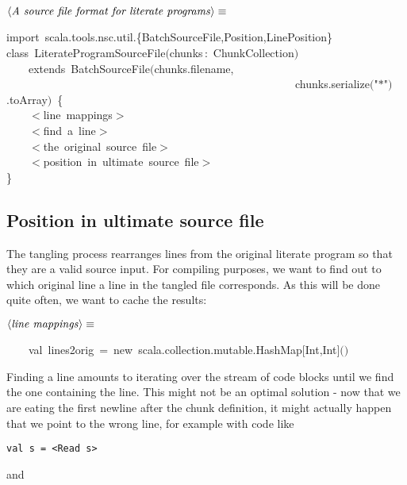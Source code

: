 \documentclass[a4paper,12pt]{article}
\begin{document}
$\left<\mbox{\emph{A source file format for literate programs}}\right>\equiv$
\begin{program}{\vem import}~scala.tools.nsc.util.{\small\{}BatchSourceFile,Position,LinePosition{\small\}}
\\{\vem class}~LiterateProgramSourceFile$($chunks\,{\rm :}~ChunkCollection$)$
\\~~~~{\vem extends}~BatchSourceFile$($chunks.filename,
\\~~~~~~~~~~~~~~~~~~~~~~~~~~~~~~~~~~~~~~~~~~~~~~~~~~~~chunks.serialize$($"$*$"$)$.toArray$)$~{\small\{}
\\~~~~$<$line~mappings$>$
\\~~~~$<$find~a~line$>$
\\~~~~$<$the~original~source~file$>$
\\~~~~$<$position~in~ultimate~source~file$>$
\\{\small\}}
\\[0.5em]\end{program}



\subsection{Position in ultimate source file}
The tangling process rearranges lines from the original literate program
so that they are a valid source input. For compiling purposes, we want to
find out to which original line a line in the tangled file corresponds. As
this will be done quite often, we want to cache the results:

$\left<\mbox{\emph{line mappings}}\right>\equiv$
\begin{program}~~~~{\vem val}~lines2orig~=~{\vem new}~scala.collection.mutable.HashMap$[$Int,Int$]$$($$)$
\\[0.5em]\end{program}


Finding a line amounts to iterating over the stream of code blocks until
we find the one containing the line. This might not be an optimal solution -
now that we are eating the first newline after the chunk definition, it
might actually happen that we point to the wrong line, for example with code
like 

\begin{verbatim}
val s = <Read s>
\end{verbatim}

and
\end{document}
